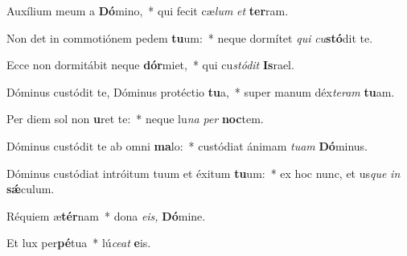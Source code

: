 \item Auxílium meum a \textbf{Dó}mino,~* qui fecit cæ\tinyhspace\textit{lum} \textit{et} \textbf{ter}ram.
\item Non det in commotiónem pedem \textbf{tu}um:~* neque dormítet \textit{qui} \textit{cu}\textbf{stó}dit te.
\item Ecce non dormitábit neque \textbf{dór}miet,~* qui cu\textit{stódit} \textbf{Is}rael.
\item Dóminus custódit te, Dóminus protéctio \textbf{tu}a,~* super manum déx\textit{teram} \textbf{tu}am.
\item Per diem sol non \textbf{u}ret te:~* neque lu\textit{na} \textit{per} \textbf{noc}tem.
\item Dóminus custódit te ab omni \textbf{ma}lo:~* custódiat ánimam \textit{tuam} \textbf{Dó}minus.
\item Dóminus custódiat intróitum tuum et éxitum \textbf{tu}um:~* ex hoc nunc, et us\tinyhspace\textit{que} \textit{in} \textbf{sǽ}culum.
\item Réquiem æ\textbf{tér}nam~* dona \textit{eis,} \textbf{Dó}mine.
\item Et lux per\textbf{pé}tua~* lú\tinyhspace\textit{ceat} \textbf{e}is.